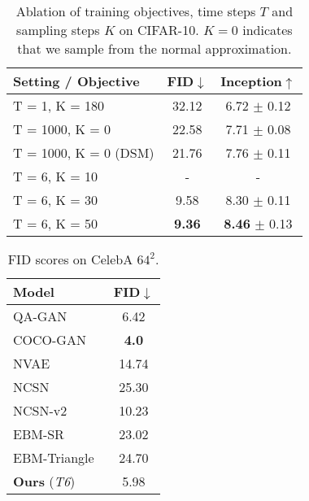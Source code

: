 \documentclass{article} \usepackage{iclr2021_conference,times}
\begin{document}
\begin{center}
\begin{minipage}[c]{.44\textwidth}
\begin{table}[H]
\centering
	\caption{Ablation of training objectives, time steps $T$ and sampling steps $K$ on CIFAR-10. $K = 0$ indicates that we sample from the normal approximation.}  
\footnotesize
	 \setlength\tabcolsep{4 pt}
 \begin{tabular}{lcc} 
    \toprule
    Setting / Objective & FID$\downarrow$ & Inception$\uparrow$ \\
    \midrule
    T = 1, K = 180 & 32.12 & 6.72 $\pm$ 0.12 \\
    T = 1000, K = 0 & 22.58 & 7.71 $\pm$ 0.08 \\
    T = 1000, K = 0 (DSM) & 21.76 & 7.76 $\pm$ 0.11 \\
    T = 6, K = 10 & - & - \\
    T = 6, K = 30 & 9.58 & 8.30 $\pm$ 0.11 \\
    T = 6, K = 50 & {\bf 9.36} & {\bf 8.46} $\pm$ 0.13 \\
        \bottomrule 
    \end{tabular}
    \label{tabl: ablation}
\end{table}
\vspace{-4mm}
\begin{table}[H]
\centering
	\caption{FID scores on CelebA $64^2$.} 
	\vspace{-0.2cm}
	\footnotesize
	 \setlength\tabcolsep{1.5pt}
	 \begin{adjustbox}{max width=\textwidth}
     \begin{tabular}{lc} 
        \toprule
        Model & FID$\downarrow$ \\
        \midrule
        QA-GAN~\citep{parimala2019quality} & 6.42 \\
        COCO-GAN~\citep{lin2019coco} & {\bf 4.0} \\
        \midrule
        NVAE~\citep{vahdat2020nvae} & 14.74 \\
        \midrule
        NCSN~\citep{song2019generative} & 25.30 \\
        NCSN-v2~\citep{song2020improved} & 10.23 \\
        \midrule
        EBM-SR~\citep{nijkamp2019learning} & 23.02\\
        EBM-Triangle~\citep{han2020joint} & 24.70 \\
        {\bf Ours} ({\em T6}) & 5.98 \\
            \bottomrule 
    \end{tabular}
    \end{adjustbox}
    \label{tabl: fid-celeba}
\end{table}
\end{minipage}
\end{center}
\end{document}
